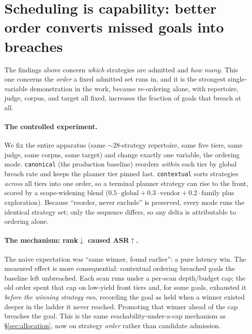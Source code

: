 \documentclass[letterpaper,twocolumn,10pt]{article}
\begin{document}
\section{Scheduling is capability: better order converts missed goals into breaches}
\label{sec:crosstier}

The findings above concern \emph{which} strategies are admitted and \emph{how many}. This one concerns the \emph{order} a fixed admitted set runs in, and it is the strongest single-variable demonstration in the work, because re-ordering alone, with repertoire, judge, corpus, and target all fixed, increases the fraction of goals that breach at all.

\paragraph{The controlled experiment.} We fix the entire apparatus (same $\sim$28-strategy repertoire, same five tiers, same judge, same corpus, same target) and change exactly one variable, the ordering mode. \texttt{canonical} (the production baseline) reorders \emph{within} each tier by global breach rate and keeps the planner tier pinned last. \texttt{contextual} sorts strategies \emph{across} all tiers into one order, so a terminal planner strategy can rise to the front, scored by a scope-widening blend ($0.5\cdot\text{global} + 0.3\cdot\text{vendor} + 0.2\cdot\text{family}$ plus exploration). Because ``reorder, never exclude'' is preserved, every mode runs the identical strategy set; only the sequence differs, so any delta is attributable to ordering alone.

\paragraph{The mechanism: rank$\downarrow$ caused ASR$\uparrow$.} The naive expectation was ``same winner, found earlier'': a pure latency win. The measured effect is more consequential: contextual ordering breached goals the baseline left unbreached. Each scan runs under a per-scan depth/budget cap; the old order spent that cap on low-yield front tiers and, for some goals, exhausted it \emph{before the winning strategy ran}, recording the goal as held when a winner existed deeper in the ladder it never reached. Promoting that winner ahead of the cap breaches the goal. This is the same reachability-under-a-cap mechanism as \S\ref{sec:allocation}, now on strategy \emph{order} rather than candidate admission.
\end{document}

